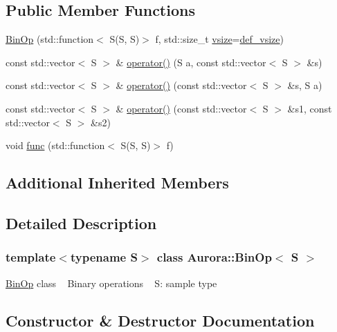 \subsection*{Public Member Functions}
\begin{DoxyCompactItemize}
\item 
\hyperlink{class_aurora_1_1_bin_op_aa4d342b5e98bd21ba48d3c29500a9978}{Bin\+Op} (std\+::function$<$ S(S, S)$>$ f, std\+::size\+\_\+t \hyperlink{class_aurora_1_1_snd_base_af9e21aaf411b17f7a8221c991ce5d291}{vsize}=\hyperlink{namespace_aurora_afaaddf667a06e7ce23c667a8b7295263}{def\+\_\+vsize})
\item 
const std\+::vector$<$ S $>$ \& \hyperlink{class_aurora_1_1_bin_op_aef7a0a9a5daa40c22e540f08ca928fab}{operator()} (S a, const std\+::vector$<$ S $>$ \&s)
\item 
const std\+::vector$<$ S $>$ \& \hyperlink{class_aurora_1_1_bin_op_a488095df0eb9f16da6643476dec9e51c}{operator()} (const std\+::vector$<$ S $>$ \&s, S a)
\item 
const std\+::vector$<$ S $>$ \& \hyperlink{class_aurora_1_1_bin_op_abe8a0b7666caeda012d9ac18f889e116}{operator()} (const std\+::vector$<$ S $>$ \&s1, const std\+::vector$<$ S $>$ \&s2)
\item 
void \hyperlink{class_aurora_1_1_bin_op_a200e19232db44814c4977be0b33654b7}{func} (std\+::function$<$ S(S, S)$>$ f)
\end{DoxyCompactItemize}
\subsection*{Additional Inherited Members}


\subsection{Detailed Description}
\subsubsection*{template$<$typename S$>$\newline
class Aurora\+::\+Bin\+Op$<$ S $>$}

\hyperlink{class_aurora_1_1_bin_op}{Bin\+Op} class ~\newline
Binary operations ~\newline
S\+: sample type 

\subsection{Constructor \& Destructor Documentation}
\mbox{\label{class_aurora_1_1_bin_op_aa4d342b5e98bd21ba48d3c29500a9978}} 
